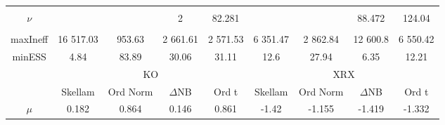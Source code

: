 \begin{footnotesize}
\begin{singlespace}
\begin{tabular}{ccccccccc}
 & \begin{tiny} [-0.035,0.183] \end{tiny}  & \begin{tiny} [-0.045,0.186] \end{tiny}  & \begin{tiny} [-0.055,0.097] \end{tiny}  & \begin{tiny} [-0.06,0.171] \end{tiny}  & \begin{tiny} [-0.056,0.076] \end{tiny}  & \begin{tiny} [-0.052,0.094] \end{tiny}  & \begin{tiny} [-0.049,0.081] \end{tiny}  & \begin{tiny} [-0.053,0.091] \end{tiny}  \\ 
$\nu$ &  &  & 2 & 82.281 &  &  & 88.472 &  124.04 \\ 
 &  &  & \begin{tiny} [2,2] \end{tiny}  & \begin{tiny} [44.9, 127.5] \end{tiny}  &  &  & \begin{tiny} [76.4,98.8] \end{tiny}  & \begin{tiny} [ 116.5, 128] \end{tiny}  \\  \midrule 
maxIneff & 16 517.03 &  953.63 & 2 661.61 & 2 571.53 & 6 351.47 & 2 862.84 & 12 600.8 & 6 550.42 \\ 
minESS & 4.84 & 83.89 & 30.06 & 31.11 & 12.6 & 27.94 & 6.35 & 12.21 \\ \midrule 
 & \multicolumn{4}{c}{KO}& \multicolumn{4}{c}{XRX} \\ 
\cmidrule(r){2-5} \cmidrule(r){6-9} &  \multicolumn{1}{c}{Skellam}&  \multicolumn{1}{c}{Ord Norm}&  \multicolumn{1}{c}{$\Delta$NB}&  \multicolumn{1}{c}{Ord t}&  \multicolumn{1}{c}{Skellam}&  \multicolumn{1}{c}{Ord Norm}&  \multicolumn{1}{c}{$\Delta$NB}&  \multicolumn{1}{c}{Ord t} \\ \midrule 
 $ \mu $ & 0.182 & 0.864 & 0.146 & 0.861 & -1.42 & -1.155 & -1.419 & -1.332 \\ 

\end{tabular}
\end{singlespace}
\end{footnotesize}
